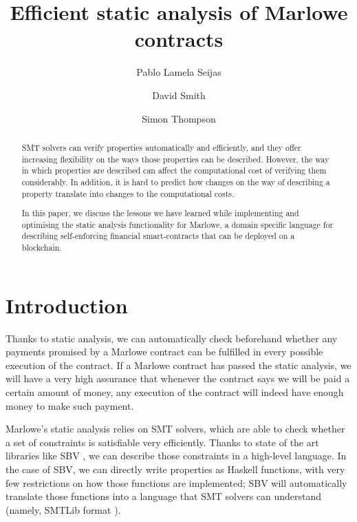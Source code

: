 \documentclass[english,runningheads]{llncs}
\begin{document}
\title{Efficient static analysis of Marlowe contracts}

\author{Pablo {Lamela Seijas} \and
        David Smith \and
        Simon Thompson}



\maketitle
\begin{abstract}
SMT solvers can verify properties automatically and efficiently, and they offer increasing
flexibility on the ways those properties can be described. However, the way in which
properties are described can affect the computational cost of verifying them considerably. In addition, it is hard to predict how changes on the way of describing a property
translate into changes to the computational costs.

In this paper, we discuss the lessons we have learned while implementing and optimising the static analysis functionality for Marlowe, a domain specific language for describing self-enforcing financial smart-contracts that can be deployed on a blockchain.
\end{abstract}
\section{Introduction\label{sec:Introduction}}

Thanks to static analysis, we can automatically check beforehand whether any
payments promised by a Marlowe contract can be fulfilled in every
possible execution of the contract. If a Marlowe contract has passed
the static analysis, we will have a very high assurance
that whenever the contract says we will be paid a certain amount of
money, any execution of the contract will indeed have enough money to
make such payment.

Marlowe's static analysis relies on SMT solvers, which are able to check whether a
set of constraints is satisfiable very efficiently. Thanks to state of the art
libraries like SBV \cite{erkok2019sbv}, we can describe those constraints in a
high-level language. In the case of SBV, we can directly write properties as
Haskell functions, with very few restrictions on how those functions are
implemented; SBV will automatically translate those functions into a language
that SMT solvers can understand (namely, SMTLib format \cite{barrett2010smt}).
\end{document}
